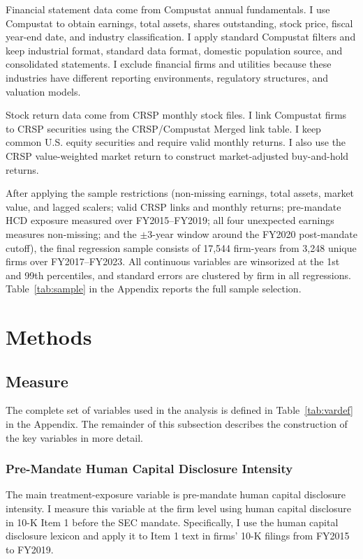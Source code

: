 \documentclass[12pt]{article}
\begin{document}
Financial statement data come from Compustat annual fundamentals. I use Compustat to obtain earnings, total assets, shares outstanding, stock price, fiscal year-end date, and industry classification. I apply standard Compustat filters and keep industrial format, standard data format, domestic population source, and consolidated statements. I exclude financial firms and utilities because these industries have different reporting environments, regulatory structures, and valuation models.

Stock return data come from CRSP monthly stock files. I link Compustat firms to CRSP securities using the CRSP/Compustat Merged link table. I keep common U.S. equity securities and require valid monthly returns. I also use the CRSP value-weighted market return to construct market-adjusted buy-and-hold returns.

After applying the sample restrictions (non-missing earnings, total assets, market value, and lagged scalers; valid CRSP links and monthly returns; pre-mandate HCD exposure measured over FY2015--FY2019; all four unexpected earnings measures non-missing; and the $\pm 3$-year window around the FY2020 post-mandate cutoff), the final regression sample consists of 17,544 firm-years from 3,248 unique firms over FY2017--FY2023. All continuous variables are winsorized at the 1st and 99th percentiles, and standard errors are clustered by firm in all regressions. Table~\ref{tab:sample} in the Appendix reports the full sample selection.

\section{Methods}

\subsection{Measure}

The complete set of variables used in the analysis is defined in Table~\ref{tab:vardef} in the Appendix. The remainder of this subsection describes the construction of the key variables in more detail.

\subsubsection{Pre-Mandate Human Capital Disclosure Intensity}

The main treatment-exposure variable is pre-mandate human capital disclosure intensity. I measure this variable at the firm level using human capital disclosure in 10-K Item 1 before the SEC mandate. Specifically, I use the \citet{demers_al2024} human capital disclosure lexicon and apply it to Item 1 text in firms' 10-K filings from FY2015 to FY2019.
\end{document}
